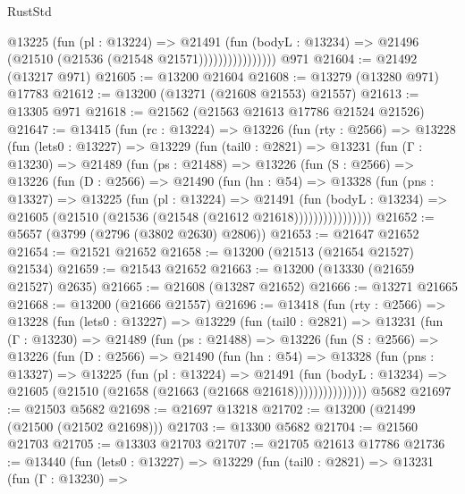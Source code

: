 \begin{lexlean}{RustStd}
\begin{coremodule}
                        @13225
                          (fun (pl : @13224) =>
                          @21491
                            (fun (bodyL : @13234) =>
                            @21496 (@21510 (@21536 (@21548 @21571))))))))))))))))
    @971
@21604 := @21492 (@13217 @971)
@21605 := @13200 @21604
@21608 := @13279 (@13280 @971) @17783
@21612 := @13200 (@13271 (@21608 @21553) @21557)
@21613 := @13305 @971
@21618 := @21562 (@21563 @21613 @17786 @21524 @21526)
@21647 := @13415
    (fun (rc : @13224) =>
    @13226
      (fun (rty : @2566) =>
      @13228
        (fun (lets0 : @13227) =>
        @13229
          (fun (tail0 : @2821) =>
          @13231
            (fun (Γ : @13230) =>
            @21489
              (fun (ps : @21488) =>
              @13226
                (fun (S : @2566) =>
                @13226
                  (fun (D : @2566) =>
                  @21490
                    (fun (hn : @54) =>
                    @13328
                      (fun (pns : @13327) =>
                      @13225
                        (fun (pl : @13224) =>
                        @21491
                          (fun (bodyL : @13234) =>
                          @21605 (@21510 (@21536 (@21548 (@21612 @21618))))))))))))))))
@21652 := @5657 (@3799 (@2796 (@3802 @2630) @2806))
@21653 := @21647 @21652
@21654 := @21521 @21652
@21658 := @13200 (@21513 (@21654 @21527) @21534)
@21659 := @21543 @21652
@21663 := @13200 (@13330 (@21659 @21527) @2635)
@21665 := @21608 (@13287 @21652)
@21666 := @13271 @21665
@21668 := @13200 (@21666 @21557)
@21696 := @13418
    (fun (rty : @2566) =>
    @13228
      (fun (lets0 : @13227) =>
      @13229
        (fun (tail0 : @2821) =>
        @13231
          (fun (Γ : @13230) =>
          @21489
            (fun (ps : @21488) =>
            @13226
              (fun (S : @2566) =>
              @13226
                (fun (D : @2566) =>
                @21490
                  (fun (hn : @54) =>
                  @13328
                    (fun (pns : @13327) =>
                    @13225
                      (fun (pl : @13224) =>
                      @21491
                        (fun (bodyL : @13234) =>
                        @21605 (@21510 (@21658 (@21663 (@21668 @21618)))))))))))))))
    @5682
@21697 := @21503 @5682
@21698 := @21697 @13218
@21702 := @13200 (@21499 (@21500 (@21502 @21698)))
@21703 := @13300 @5682
@21704 := @21560 @21703
@21705 := @13303 @21703
@21707 := @21705 @21613 @17786
@21736 := @13440
    (fun (lets0 : @13227) =>
    @13229
      (fun (tail0 : @2821) =>
      @13231
        (fun (Γ : @13230) =>

\end{coremodule}
\end{lexlean}
